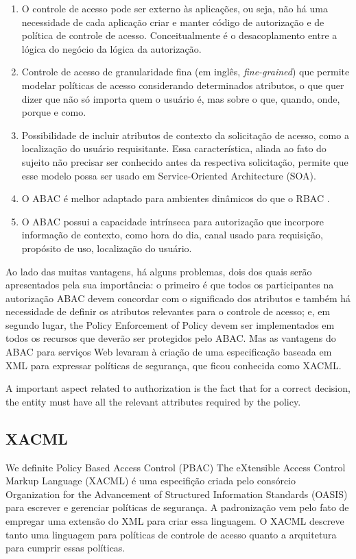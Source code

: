\documentclass{doublecol-new}
\begin{document}
\begin{enumerate}
	\item O controle de acesso pode ser externo às aplicações, ou seja, não há uma necessidade de cada aplicação criar e manter código de autorização e de política de controle de acesso. Conceitualmente é o desacoplamento entre a lógica do negócio da lógica da autorização.
	\item Controle de acesso de granularidade fina (em inglês, \textit{fine-grained}) que permite modelar políticas de acesso considerando determinados atributos, o que quer dizer que não só importa quem o usuário é, mas sobre o que, quando, onde, porque e como.
	\item Possibilidade de incluir atributos de contexto da solicitação de acesso, como a localização do usuário requisitante. Essa característica, aliada ao fato do sujeito não precisar ser conhecido antes da respectiva solicitação, permite que esse modelo possa ser usado em Service-Oriented Architecture (SOA).
	\item O ABAC é melhor adaptado para ambientes dinâmicos do que o RBAC \cite{yuan2005attributed} \cite{huABAC2014guide}.
	\item O ABAC possui a capacidade intrínseca para autorização que incorpore informação de contexto, como hora do dia, canal usado para requisição, propósito de uso, localização do usuário.
\end{enumerate}
Ao lado das muitas vantagens, há alguns problemas, dois dos quais serão apresentados pela sua importância: o primeiro é que todos os participantes na autorização ABAC devem concordar com o significado dos atributos \cite{karp2010abac} \cite{Rubio-Medrano2015federated} e também há necessidade de definir os atributos relevantes para o controle de acesso; e, em segundo lugar, the Policy Enforcement of Policy devem ser implementados em todos os recursos que deverão ser protegidos pelo ABAC. Mas as vantagens do ABAC para serviços Web levaram à criação de uma especificação baseada em XML para expressar políticas de segurança, que ficou conhecida como XACML.

A important aspect related to authorization is the fact that for a correct decision, the entity must have all the relevant attributes required by the policy.

\subsection{XACML}
We definite Policy Based Access Control (PBAC) 
The eXtensible Access Control Markup Language (XACML)\cite{rissanen2013extensible} é uma especifição criada pelo consórcio Organization for the Advancement of Structured Information Standards (OASIS) para escrever e gerenciar políticas de segurança. A padronização vem pelo fato de empregar uma extensão do XML para criar essa linguagem. O XACML descreve tanto uma linguagem para políticas de controle de acesso quanto a arquitetura para cumprir essas políticas.
\end{document}
